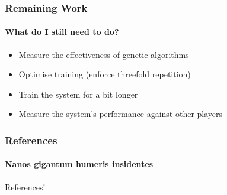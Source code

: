 \documentclass{beamer}
\begin{document}
\begin{frame}
	\frametitle{Remaining Work}
	\framesubtitle{What do I still need to do?}
	\begin{itemize}
		\item Measure the effectiveness of genetic algorithms
		\item Optimise training (enforce threefold repetition)
		\item Train the system for a bit longer
		\item Measure the system's performance against other players
	\end{itemize}

\end{frame}

\begin{frame}
	\frametitle{References}
	\framesubtitle{Nanos gigantum humeris insidentes}
	References!
\end{frame}
\end{document}
